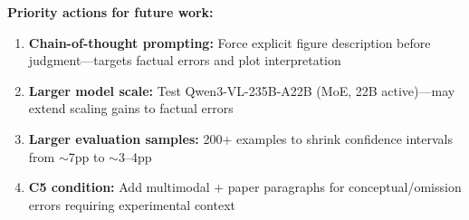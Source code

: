 \documentclass{article} %
\begin{document}
\noindent\textbf{Priority actions for future work:}
\begin{enumerate}[itemsep=1pt, topsep=2pt, leftmargin=*]
  \item \textbf{Chain-of-thought prompting:} Force explicit figure description before judgment---targets factual errors and plot interpretation
  \item \textbf{Larger model scale:} Test Qwen3-VL-235B-A22B (MoE, 22B active)---may extend scaling gains to factual errors
  \item \textbf{Larger evaluation samples:} 200+ examples to shrink confidence intervals from ${\sim}$7pp to ${\sim}$3--4pp
  \item \textbf{C5 condition:} Add multimodal + paper paragraphs for conceptual/omission errors requiring experimental context
\end{enumerate}
\end{document}
